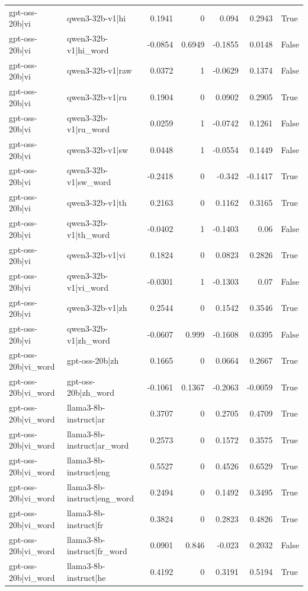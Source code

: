 \begin{table}
\begin{tabular}{l l r r r r l}
gpt-oss-20b|vi & qwen3-32b-v1|hi & 0.1941 & 0 & 0.094 & 0.2943 & True \\
gpt-oss-20b|vi & qwen3-32b-v1|hi_word & -0.0854 & 0.6949 & -0.1855 & 0.0148 & False \\
gpt-oss-20b|vi & qwen3-32b-v1|raw & 0.0372 & 1 & -0.0629 & 0.1374 & False \\
gpt-oss-20b|vi & qwen3-32b-v1|ru & 0.1904 & 0 & 0.0902 & 0.2905 & True \\
gpt-oss-20b|vi & qwen3-32b-v1|ru_word & 0.0259 & 1 & -0.0742 & 0.1261 & False \\
gpt-oss-20b|vi & qwen3-32b-v1|sw & 0.0448 & 1 & -0.0554 & 0.1449 & False \\
gpt-oss-20b|vi & qwen3-32b-v1|sw_word & -0.2418 & 0 & -0.342 & -0.1417 & True \\
gpt-oss-20b|vi & qwen3-32b-v1|th & 0.2163 & 0 & 0.1162 & 0.3165 & True \\
gpt-oss-20b|vi & qwen3-32b-v1|th_word & -0.0402 & 1 & -0.1403 & 0.06 & False \\
gpt-oss-20b|vi & qwen3-32b-v1|vi & 0.1824 & 0 & 0.0823 & 0.2826 & True \\
gpt-oss-20b|vi & qwen3-32b-v1|vi_word & -0.0301 & 1 & -0.1303 & 0.07 & False \\
gpt-oss-20b|vi & qwen3-32b-v1|zh & 0.2544 & 0 & 0.1542 & 0.3546 & True \\
gpt-oss-20b|vi & qwen3-32b-v1|zh_word & -0.0607 & 0.999 & -0.1608 & 0.0395 & False \\
gpt-oss-20b|vi_word & gpt-oss-20b|zh & 0.1665 & 0 & 0.0664 & 0.2667 & True \\
gpt-oss-20b|vi_word & gpt-oss-20b|zh_word & -0.1061 & 0.1367 & -0.2063 & -0.0059 & True \\
gpt-oss-20b|vi_word & llama3-8b-instruct|ar & 0.3707 & 0 & 0.2705 & 0.4709 & True \\
gpt-oss-20b|vi_word & llama3-8b-instruct|ar_word & 0.2573 & 0 & 0.1572 & 0.3575 & True \\
gpt-oss-20b|vi_word & llama3-8b-instruct|eng & 0.5527 & 0 & 0.4526 & 0.6529 & True \\
gpt-oss-20b|vi_word & llama3-8b-instruct|eng_word & 0.2494 & 0 & 0.1492 & 0.3495 & True \\
gpt-oss-20b|vi_word & llama3-8b-instruct|fr & 0.3824 & 0 & 0.2823 & 0.4826 & True \\
gpt-oss-20b|vi_word & llama3-8b-instruct|fr_word & 0.0901 & 0.846 & -0.023 & 0.2032 & False \\
gpt-oss-20b|vi_word & llama3-8b-instruct|he & 0.4192 & 0 & 0.3191 & 0.5194 & True \\

\end{tabular}
\end{table}
